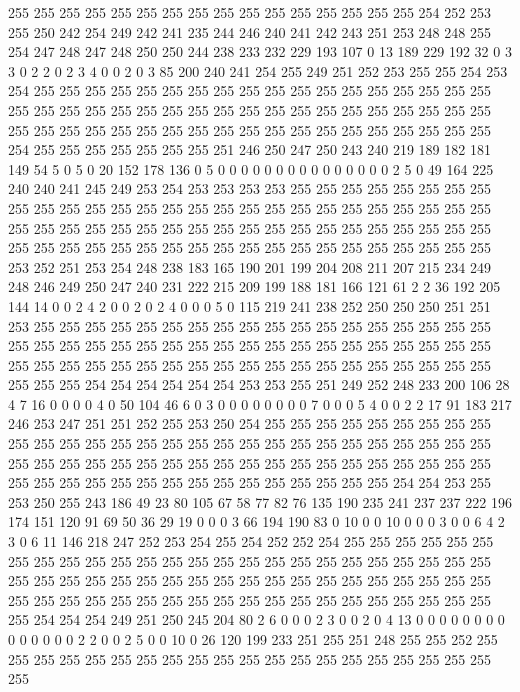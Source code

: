 255 255 255 255 255 255 255 255 255 255 255 255 255 255 255 255 254 252 253 255
250 242 254 249 242 241 235 244 246 240 241 242 243 251 253 248 248 255 254 247
248 247 248 250 250 244 238 233 232 229 193 107 0 13 189 229 192 32 0 3
3 0 2 2 0 2 3 4 0 0 2 0 3 85 200 240 241 254 255 249
251 252 253 255 255 254 253 254 255 255 255 255 255 255 255 255 255 255 255 255
255 255 255 255 255 255 255 255 255 255 255 255 255 255 255 255 255 255 255 255
255 255 255 255 255 255 255 255 255 255 255 255 255 255 255 255 255 255 255 255
255 255 255 255 254 255 255 255 255 255 255 255 251 246 250 247 250 243 240 219
189 182 181 149 54 5 0 5 0 20 152 178 136 0 5 0 0 0 0 0
0 0 0 0 0 0 0 0 0 0 2 5 0 49 164 225 240 240 241 245
249 253 254 253 253 253 253 255 255 255 255 255 255 255 255 255 255 255 255 255
255 255 255 255 255 255 255 255 255 255 255 255 255 255 255 255 255 255 255 255
255 255 255 255 255 255 255 255 255 255 255 255 255 255 255 255 255 255 255 255
255 255 255 255 255 255 255 255 255 255 255 255 253 252 251 253 254 248 238 183
165 190 201 199 204 208 211 207 215 234 249 248 246 249 250 247 240 231 222 215
209 199 188 181 166 121 61 2 2 36 192 205 144 14 0 0 2 4 2 0
0 2 0 2 4 0 0 0 5 0 115 219 241 238 252 250 250 250 251 251
253 255 255 255 255 255 255 255 255 255 255 255 255 255 255 255 255 255 255 255
255 255 255 255 255 255 255 255 255 255 255 255 255 255 255 255 255 255 255 255
255 255 255 255 255 255 255 255 255 255 255 255 255 255 255 255 255 255 255 255
254 254 254 254 254 254 253 253 255 251 249 252 248 233 200 106 28 4 7 16
0 0 0 0 4 0 50 104 46 6 0 3 0 0 0 0 0 0 0 0
7 0 0 0 5 4 0 0 2 2 17 91 183 217 246 253 247 251 251 252
255 253 250 254 255 255 255 255 255 255 255 255 255 255 255 255 255 255 255 255
255 255 255 255 255 255 255 255 255 255 255 255 255 255 255 255 255 255 255 255
255 255 255 255 255 255 255 255 255 255 255 255 255 255 255 255 255 255 255 255
255 255 255 255 255 255 254 254 253 255 253 250 255 243 186 49 23 80 105 67
58 77 82 76 135 190 235 241 237 237 222 196 174 151 120 91 69 50 36 29
19 0 0 0 3 66 194 190 83 0 10 0 0 10 0 0 0 3 0 0
6 4 2 3 0 6 11 146 218 247 252 253 254 255 254 252 252 254 255 255
255 255 255 255 255 255 255 255 255 255 255 255 255 255 255 255 255 255 255 255
255 255 255 255 255 255 255 255 255 255 255 255 255 255 255 255 255 255 255 255
255 255 255 255 255 255 255 255 255 255 255 255 255 255 255 255 255 255 255 255
255 255 254 254 254 249 251 250 245 204 80 2 6 0 0 0 2 3 0 0
2 0 4 13 0 0 0 0 0 0 0 0 0 0 0 0 0 0 2 2
0 0 2 5 0 0 10 0 26 120 199 233 251 255 251 248 255 255 252 255
255 255 255 255 255 255 255 255 255 255 255 255 255 255 255 255 255 255 255 255
